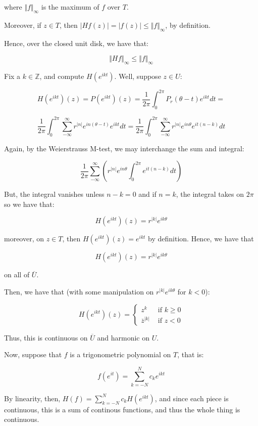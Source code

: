 \documentclass[10pt]{article}
\begin{document}
where $\Vert f \Vert_\infty$ is the maximum of $f$ over $T$.

Moreover, if $z \in T$, then $| Hf(z) | = |f(z)| \leq \Vert f \Vert_\infty$, by definition.

Hence, over the closed unit disk, we have that:

$$ \Vert Hf \Vert_\infty \leq \Vert f \Vert_\infty $$

Fix a $k \in \mathbb{Z}$, and compute $H(e^{ikt})$. Well, suppose $z \in U$:

$$ H(e^{ikt})(z) = P(e^{ikt})(z) = \frac{1}{2 \pi } \int_0^{2\pi} P_r(\theta - t) e^{ikt} dt =   $$

$$ \frac{1}{2 \pi } \int_0^{2\pi} \sum_{-\infty}^\infty r^{|n|} e^{in(\theta - t)} e^{ikt} dt = \frac{1}{2 \pi } \int_0^{2\pi} \sum_{-\infty}^\infty r^{|n|} e^{in\theta} e^{it(n-k)} dt $$

Again, by the Weierstrauss M-test, we may interchange the sum and integral:

$$ \frac{1}{2\pi}  \sum_{-\infty}^\infty \left( r^{|n|} e^{in\theta} \int_0^{2\pi} e^{it(n-k)} dt  \right)$$

But, the integral vanishes unless $n-k = 0$ and if $ n=k$, the integral takes on $2\pi$ so we have that:

$$ H(e^{ikt})(z) = r^{|k|} e^{ik\theta}$$

moreover, on $z \in T$, then $H(e^{ikt})(z) = e^{ikt}$ by definition. Hence, we have that

$$ H(e^{ikt})(z) = r^{|k|} e^{ik\theta}$$

on all of $\overline{U}$. 

Then, we have that (with some manipulation on $r^{|k|} e^{ik\theta}$ for $k < 0$):

$$ H(e^{ikt})(z) = \begin{cases} z^k & \text{ if } k \geq 0 \\ \overline{z}^{|k|} & \text{ if } z < 0 \end{cases} $$

Thus, this is continuous on $\overline{U}$ and harmonic on $U$. 

Now, suppose that $f$ is a trigonometric polynomial on $T$, that is:

$$ f(e^{it}) = \sum_{k=-N}^N c_k e^{ikt} $$

By linearity, then, $H(f) = \sum_{k=-N}^N c_kH(e^{ikt})$, and since each piece is continuous, this is a sum of continous functions, and thus the whole thing is continuous.
\end{document}
